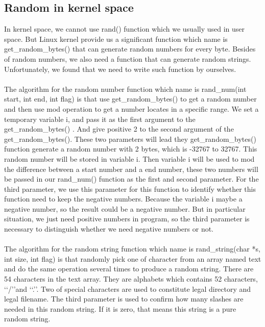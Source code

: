 \documentclass[twoside]{article}
\begin{document}
\begin{multicols}{2}
\subsection{Random in kernel space}
In kernel space, we cannot use rand() function which we usually used in user space. But Linux kernel provide us a significant function which name is get\_random\_bytes() that can generate random numbers for every byte. Besides of random numbers, we also need a function that can generate random strings. Unfortunately, we found that we need to write such function by ourselves.\\\\
The algorithm for the random number function which name is rand\_num(int start, int end, int flag) is that use get\_random\_bytes() to get a random number and then use mod operation to get a number locates in a specific range. We set a temporary variable i, and pass it as the first argument to the get\_random\_bytes() . And give positive 2 to the second argument of the get\_random\_bytes(). These two parameters will lead they get\_random\_bytes() function generate a random number with 2 bytes, which is -32767 to 32767. This random number will be stored in variable i. Then variable i will be used to mod the difference between a start number and a end number, these two numbers will be passed in our rand\_num() function as the first and second parameter. For the third parameter, we use this parameter for this function to identify whether this function need to keep the negative numbers. Because the variable i maybe a negative number, so the result could be a negative number. But in particular situation, we just need positive numbers in program, so the third parameter is necessary to distinguish whether we need negative numbers or not.\\\\
The algorithm for the random string function which name is rand\_string(char *s, int size, int flag) is that randomly pick one of character from an array named text and do the same operation several times to produce a random string. There are 54 characters in the text array. They are alphabets which contains 52 characters, \lq\lq/\rq\rq and \lq\lq.\rq\rq. Two of special characters are used to constitute legal directory and legal filename. The third parameter is used to confirm how many slashes are needed in this random string. If it is zero, that means this string is a pure random string.

\end{multicols}
\end{document}
